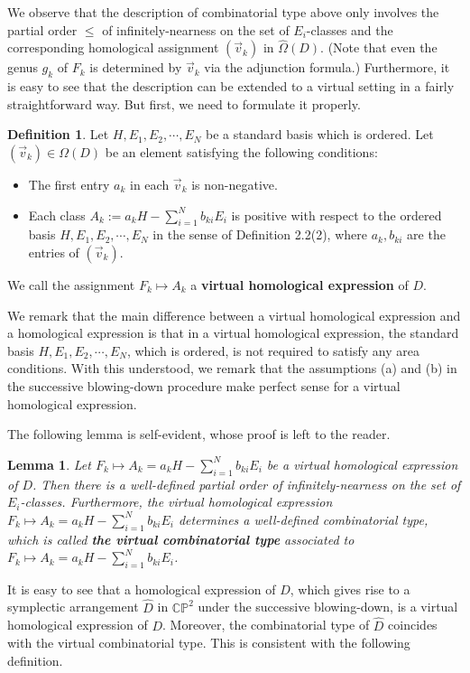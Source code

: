 \documentclass[11pt]{amsart}
\theoremstyle{plain}
\numberwithin{theorem}{section}
\newtheorem{lemma}[theorem]{Lemma}
\theoremstyle{definition}
\newtheorem{definition}[theorem]{Definition}
\newcommand{\C}{{\mathbb C}}
\renewcommand{\P}{{\mathbb P}}
\begin{document}
We observe that the description of combinatorial type above only involves the partial order $\leq$ of infinitely-nearness on the set of $E_i$-classes and the corresponding homological assignment $(\vec{v}_k)$ in 
$\hat{\Omega}(D)$. (Note that even the genus $g_k$ of $F_k$ is determined by $\vec{v}_k$ via the adjunction formula.) 
Furthermore, it is easy to see that the description can be extended to a virtual setting in a
fairly straightforward way. But first, we need to formulate it properly. 

\begin{definition}
Let  $H,E_1,E_2,\cdots,E_N$ be a standard basis which is ordered. Let $(\vec{v}_k)\in \Omega(D)$ be an element 
satisfying the following conditions:
\begin{itemize}
\item The first entry $a_k$ in each $\vec{v}_k$ is non-negative.
\item Each class $A_k:=a_k H-\sum_{i=1}^N b_{ki}E_i$ is positive with respect to the ordered basis $H,E_1,E_2,\cdots,E_N$ in the sense of Definition 2.2(2), where $a_k,b_{ki}$ are the entries of $(\vec{v}_k)$.
\end{itemize}
We call the assignment $F_k\mapsto A_k$ a {\bf virtual homological expression} of $D$.
\end{definition}

We remark that the main difference between a virtual homological expression and a homological expression is that in a virtual homological expression, the standard basis $H,E_1,E_2,\cdots,E_N$, which is ordered, is not required to satisfy any area conditions.
With this understood, we remark that the assumptions (a) and (b) in the successive blowing-down procedure make perfect sense for a virtual homological expression. 

The following lemma is self-evident, whose proof is left to the reader. 

\begin{lemma}
Let $F_k\mapsto A_k=a_k H-\sum_{i=1}^N b_{ki} E_i$ be a virtual homological expression of $D$. Then there is a well-defined partial order of infinitely-nearness on the set of $E_i$-classes. Furthermore, the virtual homological expression $F_k\mapsto A_k=a_k H-\sum_{i=1}^N b_{ki} E_i$ determines a well-defined combinatorial type, which
is called {\bf the virtual combinatorial type} associated to $F_k\mapsto A_k=a_k H-\sum_{i=1}^N b_{ki} E_i$.
\end{lemma}

It is easy to see that a homological expression of $D$, which gives rise to a symplectic arrangement $\hat{D}$ in
$\C\P^2$ under the successive blowing-down, is a virtual homological expression of $D$. Moreover, the combinatorial type of $\hat{D}$ coincides with the virtual combinatorial type. This is consistent with the following definition.
\end{document}
